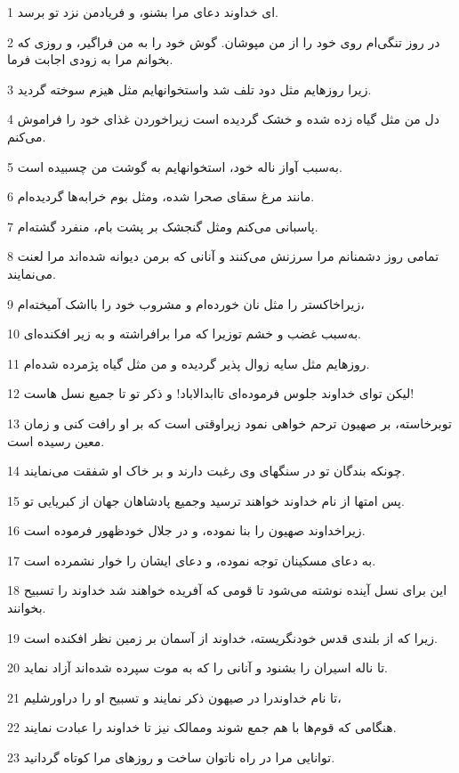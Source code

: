 \par 1 ای خداوند دعای مرا بشنو، و فریادمن نزد تو برسد.
\par 2 در روز تنگی‌ام روی خود را از من مپوشان. گوش خود را به من فراگیر، و روزی که بخوانم مرا به زودی اجابت فرما.
\par 3 زیرا روزهایم مثل دود تلف شد واستخوانهایم مثل هیزم سوخته گردید.
\par 4 دل من مثل گیاه زده شده و خشک گردیده است زیراخوردن غذای خود را فراموش می‌کنم.
\par 5 به‌سبب آواز ناله خود، استخوانهایم به گوشت من چسبیده است.
\par 6 مانند مرغ سقای صحرا شده، ومثل بوم خرابه‌ها گردیده‌ام.
\par 7 پاسبانی می‌کنم ومثل گنجشک بر پشت بام، منفرد گشته‌ام.
\par 8 تمامی روز دشمنانم مرا سرزنش می‌کنند و آنانی که برمن دیوانه شده‌اند مرا لعنت می‌نمایند.
\par 9 زیراخاکستر را مثل نان خورده‌ام و مشروب خود را بااشک آمیخته‌ام،
\par 10 به‌سبب غضب و خشم توزیرا که مرا برافراشته و به زیر افکنده‌ای.
\par 11 روزهایم مثل سایه زوال پذیر گردیده و من مثل گیاه پژمرده شده‌ام.
\par 12 لیکن تو‌ای خداوند جلوس فرموده‌ای تاابدالاباد! و ذکر تو تا جمیع نسل هاست!
\par 13 توبرخاسته، بر صهیون ترحم خواهی نمود زیراوقتی است که بر او رافت کنی و زمان معین رسیده است.
\par 14 چونکه بندگان تو در سنگهای وی رغبت دارند و بر خاک او شفقت می‌نمایند.
\par 15 پس امتها از نام خداوند خواهند ترسید وجمیع پادشاهان جهان از کبریایی تو.
\par 16 زیراخداوند صهیون را بنا نموده، و در جلال خودظهور فرموده است.
\par 17 به دعای مسکینان توجه نموده، و دعای ایشان را خوار نشمرده است.
\par 18 این برای نسل آینده نوشته می‌شود تا قومی که آفریده خواهند شد خداوند را تسبیح بخوانند.
\par 19 زیرا که از بلندی قدس خودنگریسته، خداوند از آسمان بر زمین نظر افکنده است.
\par 20 تا ناله اسیران را بشنود و آنانی را که به موت سپرده شده‌اند آزاد نماید.
\par 21 تا نام خداوندرا در صیهون ذکر نمایند و تسبیح او را دراورشلیم،
\par 22 هنگامی که قوم‌ها با هم جمع شوند وممالک نیز تا خداوند را عبادت نمایند.
\par 23 توانایی مرا در راه ناتوان ساخت و روزهای مرا کوتاه گردانید.
